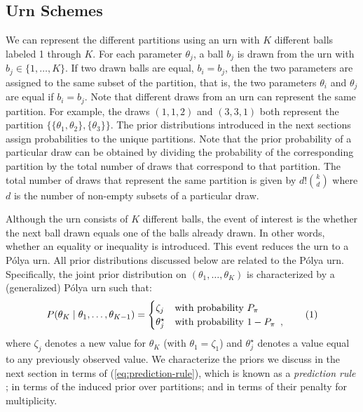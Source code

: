 \documentclass[11pt,a4paper]{article}
\theoremstyle{definition} %
\theoremstyle{case}
\newcommand{\numberthis}{\addtocounter{equation}{1}\tag{\theequation}}
\begin{document}
\subsection{Urn Schemes}
We can represent the different partitions using an urn with $K$ different balls labeled 1 through $K$. For each parameter $\theta_j$, a ball $b_j$ is drawn from the urn with $b_j \in \{1, \ldots, K\}$. If two drawn balls are equal, $b_i = b_j$, then the two parameters are assigned to the same subset of the partition, that is, the two parameters $\theta_i$ and $\theta_j$ are equal if $b_i = b_j$. Note that different draws from an urn can represent the same partition. For example, the draws $(1, 1, 2)$ and $(3, 3, 1)$ both represent the partition $\{\{\theta_1, \theta_2\}, \{\theta_3\}\}$. The prior distributions introduced in the next sections assign probabilities to the unique partitions. Note that the prior probability of a particular draw can be obtained by dividing the probability of the corresponding partition by the total number of draws that correspond to that partition. The total number of draws that represent the same partition is given by $d!\binom{k}{d}$ where $d$ is the number of non-empty subsets of a particular draw.

Although the urn consists of $K$ different balls, the event of interest is the whether the next ball drawn equals one of the balls already drawn. In other words, whether an equality or inequality is introduced. This event reduces the urn to a P\'{o}lya urn. All prior distributions discussed below are related to the P\'{o}lya urn. Specifically, the joint prior distribution on $(\theta_1, \ldots, \theta_K)$ is characterized by a (generalized) P\'{o}lya urn such that:
\begin{equation} \label{eq:prediction-rule}
    P(\theta_K \mid \theta_1, \ldots, \theta_{K - 1}) = \begin{cases}
    \zeta_j & \text{with probability } P_{\pi} \\
    \theta_j^{\star} & \text{with probability }  1- P_{\pi} \enspace ,
    \end{cases} \numberthis
\end{equation}
where $\zeta_j$ denotes a new value for $\theta_K$ (with $\theta_1 = \zeta_1$) and $\theta_j^{\star}$ denotes a value equal to any previously observed value. We characterize the priors we discuss in the next section in terms of (\ref{eq:prediction-rule}), which is known as a \textit{prediction rule} \parencite[e.g.,][]{ishwaran2001gibbs}; in terms of the induced prior over partitions; and in terms of their penalty for multiplicity.
\end{document}
